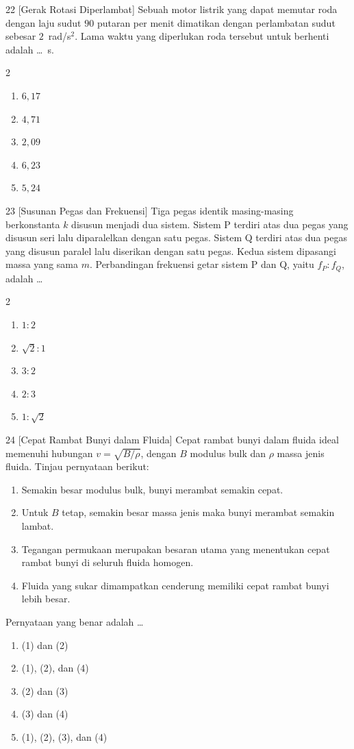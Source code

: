 \documentclass[11pt]{article}
\newenvironment{pil}{%
  \begin{enumerate}[label=(\alph*),leftmargin=*,itemsep=1pt,topsep=3pt]}%
  {\end{enumerate}}
\newenvironment{pilB}{%
  \par\smallskip\begin{multicols}{2}
  \begin{enumerate}[label=(\alph*),leftmargin=*,itemsep=1pt,topsep=3pt]}%
  {\end{enumerate}\end{multicols}}
\begin{document}
\begin{soal}{22 \normalfont\small[Gerak Rotasi Diperlambat]}
Sebuah motor listrik yang dapat memutar roda dengan laju sudut $90$ putaran per menit
dimatikan dengan perlambatan sudut sebesar $2$~rad/s$^2$. Lama waktu yang diperlukan
roda tersebut untuk berhenti adalah \ldots~s.
\begin{pilB}
  \item $6{,}17$ \item $4{,}71$ \item $2{,}09$ \item $6{,}23$ \item $5{,}24$
\end{pilB}
\end{soal}

\begin{soal}{23 \normalfont\small[Susunan Pegas dan Frekuensi]}
Tiga pegas identik masing-masing berkonstanta $k$ disusun menjadi dua sistem. Sistem P
terdiri atas dua pegas yang disusun seri lalu diparalelkan dengan satu pegas. Sistem Q
terdiri atas dua pegas yang disusun paralel lalu diserikan dengan satu pegas. Kedua sistem
dipasangi massa yang sama $m$. Perbandingan frekuensi getar sistem P dan Q, yaitu
$f_P:f_Q$, adalah \ldots
\begin{pilB}
  \item $1:2$ \item $\sqrt{2}:1$ \item $3:2$ \item $2:3$ \item $1:\sqrt{2}$
\end{pilB}
\end{soal}

\begin{soal}{24 \normalfont\small[Cepat Rambat Bunyi dalam Fluida]}
Cepat rambat bunyi dalam fluida ideal memenuhi hubungan $v=\sqrt{B/\rho}$, dengan $B$
modulus bulk dan $\rho$ massa jenis fluida. Tinjau pernyataan berikut:
\begin{enumerate}[label=(\arabic*),leftmargin=*,topsep=2pt,itemsep=1pt]
  \item Semakin besar modulus bulk, bunyi merambat semakin cepat.
  \item Untuk $B$ tetap, semakin besar massa jenis maka bunyi merambat semakin lambat.
  \item Tegangan permukaan merupakan besaran utama yang menentukan cepat rambat bunyi di
        seluruh fluida homogen.
  \item Fluida yang sukar dimampatkan cenderung memiliki cepat rambat bunyi lebih besar.
\end{enumerate}
Pernyataan yang benar adalah \ldots
\begin{pil}
  \item (1) dan (2)
  \item (1), (2), dan (4)
  \item (2) dan (3)
  \item (3) dan (4)
  \item (1), (2), (3), dan (4)
\end{pil}
\end{soal}
\end{document}
